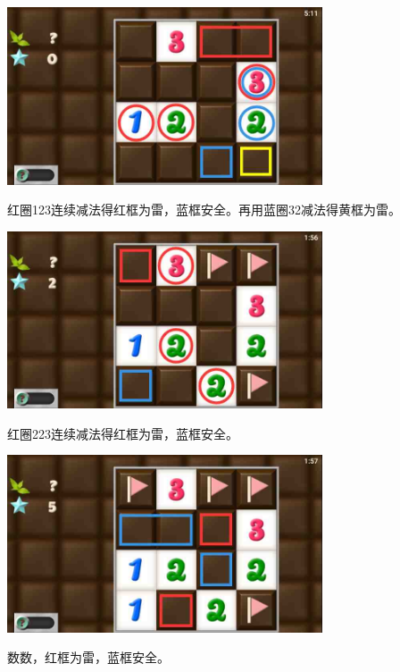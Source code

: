\subsection{} %
\begin{center}
    \includegraphics[width=0.7\textwidth]{puzzlelow/50-1.jpg}
\end{center}
红圈123连续减法得红框为雷，蓝框安全。再用蓝圈32减法得黄框为雷。
\begin{center}
    \includegraphics[width=0.7\textwidth]{puzzlelow/50-2.jpg}
\end{center}
红圈223连续减法得红框为雷，蓝框安全。
\begin{center}
    \includegraphics[width=0.7\textwidth]{puzzlelow/50-3.jpg}
\end{center}
数数，红框为雷，蓝框安全。

